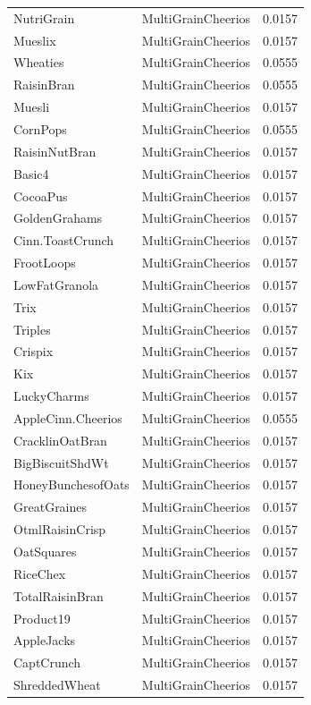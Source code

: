\begin{longtable}{llr}
NutriGrain & MultiGrainCheerios & 0.0157 \\
Mueslix & MultiGrainCheerios & 0.0157 \\
Wheaties & MultiGrainCheerios & 0.0555 \\
RaisinBran & MultiGrainCheerios & 0.0555 \\
Muesli & MultiGrainCheerios & 0.0157 \\
CornPops & MultiGrainCheerios & 0.0555 \\
RaisinNutBran & MultiGrainCheerios & 0.0157 \\
Basic4 & MultiGrainCheerios & 0.0157 \\
CocoaPus & MultiGrainCheerios & 0.0157 \\
GoldenGrahams & MultiGrainCheerios & 0.0157 \\
Cinn.ToastCrunch & MultiGrainCheerios & 0.0157 \\
FrootLoops & MultiGrainCheerios & 0.0157 \\
LowFatGranola & MultiGrainCheerios & 0.0157 \\
Trix & MultiGrainCheerios & 0.0157 \\
Triples & MultiGrainCheerios & 0.0157 \\
Crispix & MultiGrainCheerios & 0.0157 \\
Kix & MultiGrainCheerios & 0.0157 \\
LuckyCharms & MultiGrainCheerios & 0.0157 \\
AppleCinn.Cheerios & MultiGrainCheerios & 0.0555 \\
CracklinOatBran & MultiGrainCheerios & 0.0157 \\
BigBiscuitShdWt & MultiGrainCheerios & 0.0157 \\
HoneyBunchesofOats & MultiGrainCheerios & 0.0157 \\
GreatGraines & MultiGrainCheerios & 0.0157 \\
OtmlRaisinCrisp & MultiGrainCheerios & 0.0157 \\
OatSquares & MultiGrainCheerios & 0.0157 \\
RiceChex & MultiGrainCheerios & 0.0157 \\
TotalRaisinBran & MultiGrainCheerios & 0.0157 \\
Product19 & MultiGrainCheerios & 0.0157 \\
AppleJacks & MultiGrainCheerios & 0.0157 \\
CaptCrunch & MultiGrainCheerios & 0.0157 \\
ShreddedWheat & MultiGrainCheerios & 0.0157 \\

\end{longtable}
